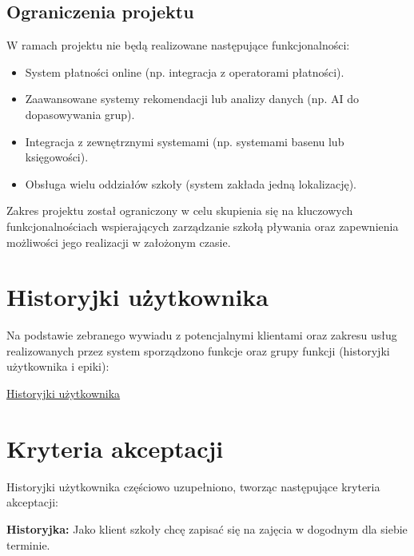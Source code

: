 \documentclass[a4paper,12pt]{article}
\begin{document}
\subsection{Ograniczenia projektu}

W ramach projektu nie będą realizowane następujące funkcjonalności:

\begin{itemize}
    \item System płatności online (np. integracja z operatorami płatności).
    \item Zaawansowane systemy rekomendacji lub analizy danych (np. AI do dopasowywania grup).
    \item Integracja z zewnętrznymi systemami (np. systemami basenu lub księgowości).
    \item Obsługa wielu oddziałów szkoły (system zakłada jedną lokalizację).
\end{itemize}

\noindent Zakres projektu został ograniczony w celu skupienia się na kluczowych funkcjonalnościach wspierających zarządzanie szkołą pływania oraz zapewnienia możliwości jego realizacji w założonym czasie.

\section{Historyjki użytkownika}

Na podstawie zebranego wywiadu z potencjalnymi klientami oraz zakresu usług realizowanych przez system sporządzono funkcje oraz grupy funkcji (historyjki użytkownika i epiki):


    \href{https://miro.com/app/board/uXjVGhIZc0o=/?share_link_id=551717895193&fbclid=IwY2xjawRN7u5leHRuA2FlbQIxMQBzcnRjBmFwcF9pZAEwAAEe4j1wzOOpdSMzaaRcfPo6reTUNB9p4stcNAqF229sS7GpICpJkEuh1ZtUa4c_aem_KaomdIRAQT2vZ8EuAeP3vA}{Historyjki użytkownika}

\section{Kryteria akceptacji}

Historyjki użytkownika częściowo uzupełniono, tworząc następujące kryteria akceptacji:

\vspace{0,5cm}

\noindent \textbf{Historyjka:} Jako klient szkoły chcę zapisać się na zajęcia w dogodnym dla siebie terminie.
\end{document}
